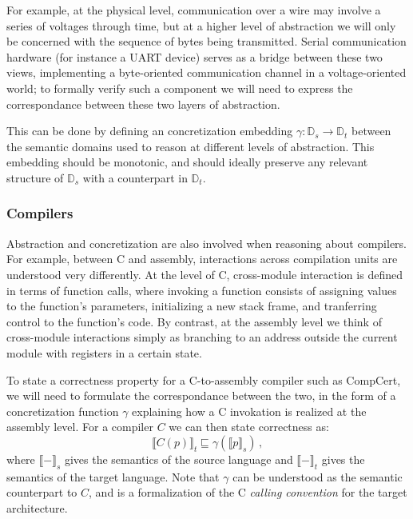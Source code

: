 \documentclass[acmsmall,timestamp,review,anonymous]{acmart}
\begin{document}
For example,
at the physical level,
communication over a wire may involve a series of voltages through time,
but at a higher level of abstraction
we will only be concerned with the sequence of bytes
being transmitted.
Serial communication hardware (for instance a UART device)
serves as a bridge between these two views,
implementing a byte-oriented communication channel
in a voltage-oriented world;
to formally verify such a component we will need to
express the correspondance between these two
layers of abstraction.

This can be done by defining an concretization embedding
$\gamma : \mathbb{D}_s \rightarrow \mathbb{D}_t$
between the semantic domains
used to reason at different levels of abstraction.
This embedding should be monotonic,
and should ideally preserve any relevant structure of $\mathbb{D}_s$
with a counterpart in $\mathbb{D}_t$.


\subsubsection{Compilers} %

Abstraction and concretization are
also involved when reasoning about compilers.
For example,
between C and assembly,
interactions across compilation units
are understood very differently.
At the level of C,
cross-module interaction is defined in terms of
function calls,
where invoking a function consists of assigning values
to the function's parameters,
initializing a new stack frame,
and tranferring control to the function's code.
By contrast,
at the assembly level we think of cross-module
interactions simply as branching to an address
outside the current module with
registers in a certain state.

To state a correctness property for a C-to-assembly compiler
such as CompCert,
we will need to formulate the correspondance between the two,
in the form of a concretization function $\gamma$
explaining how a C invokation is realized at the assembly level.
For a compiler $C$ we can then state correctness as:
\[ \llbracket C(p) \rrbracket_t \sqsubseteq
   \gamma(\llbracket p \rrbracket_s) \,, \]
where
$\llbracket - \rrbracket_s$ gives the semantics of the source language and
$\llbracket - \rrbracket_t$ gives the semantics of the target language.
Note that $\gamma$ can be understood as the semantic counterpart to $C$,
and is a formalization of the C \emph{calling convention}
for the target architecture.
\end{document}
